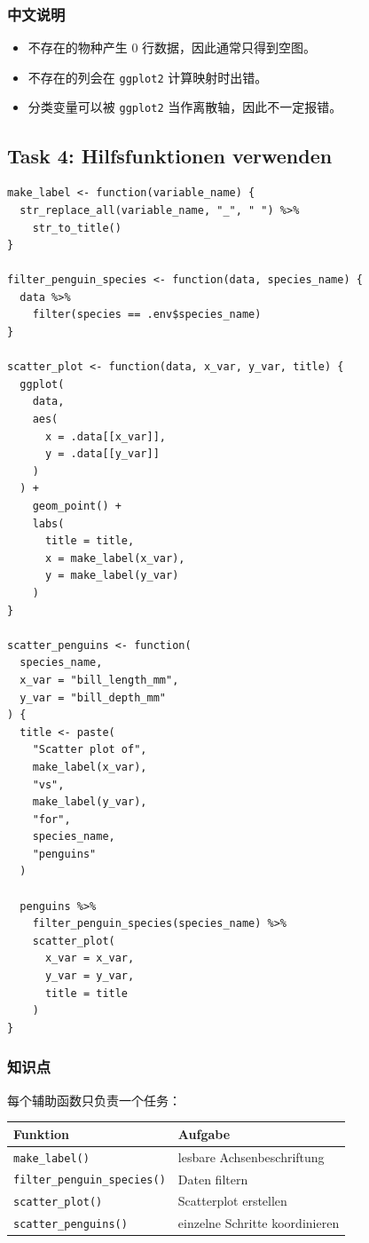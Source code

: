 \documentclass[11pt,a4paper]{ctexart}
\begin{document}
\subsubsection*{中文说明}

\begin{itemize}
  \item 不存在的物种产生 0 行数据，因此通常只得到空图。
  \item 不存在的列会在 \texttt{ggplot2} 计算映射时出错。
  \item 分类变量可以被 \texttt{ggplot2} 当作离散轴，因此不一定报错。
\end{itemize}

\subsection{Task 4: Hilfsfunktionen verwenden}

\begin{lstlisting}
make_label <- function(variable_name) {
  str_replace_all(variable_name, "_", " ") %>%
    str_to_title()
}

filter_penguin_species <- function(data, species_name) {
  data %>%
    filter(species == .env$species_name)
}

scatter_plot <- function(data, x_var, y_var, title) {
  ggplot(
    data,
    aes(
      x = .data[[x_var]],
      y = .data[[y_var]]
    )
  ) +
    geom_point() +
    labs(
      title = title,
      x = make_label(x_var),
      y = make_label(y_var)
    )
}

scatter_penguins <- function(
  species_name,
  x_var = "bill_length_mm",
  y_var = "bill_depth_mm"
) {
  title <- paste(
    "Scatter plot of",
    make_label(x_var),
    "vs",
    make_label(y_var),
    "for",
    species_name,
    "penguins"
  )

  penguins %>%
    filter_penguin_species(species_name) %>%
    scatter_plot(
      x_var = x_var,
      y_var = y_var,
      title = title
    )
}
\end{lstlisting}

\subsubsection*{知识点}

每个辅助函数只负责一个任务：

\begin{center}
\begin{tabular}{ll}
\toprule
Funktion & Aufgabe \\
\midrule
\texttt{make\_label()} & lesbare Achsenbeschriftung \\
\texttt{filter\_penguin\_species()} & Daten filtern \\
\texttt{scatter\_plot()} & Scatterplot erstellen \\
\texttt{scatter\_penguins()} & einzelne Schritte koordinieren \\
\bottomrule
\end{tabular}
\end{center}
\end{document}
